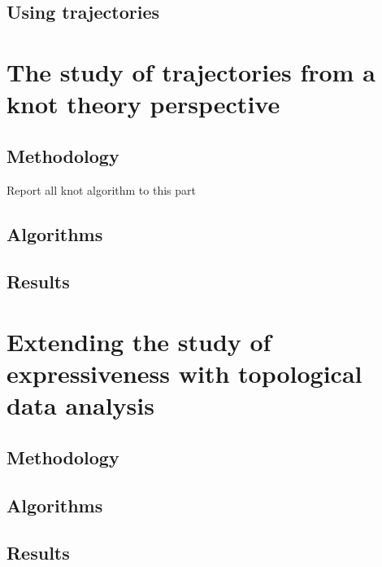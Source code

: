 \documentclass[12pt, a4paper]{article}
\begin{document}
\subsection{Using trajectories}

\newpage
\thispagestyle{empty}
\mbox{}
\newpage

\section{The study of trajectories from a knot theory perspective}

\subsection{Methodology}

Report all knot algorithm to this part

\subsection{Algorithms}

\subsection{Results}

\newpage
\thispagestyle{empty}
\mbox{}
\newpage

\section{Extending the study of expressiveness with topological data analysis} 
\subsection{Methodology}

\subsection{Algorithms}

\subsection{Results}

\newpage
\thispagestyle{empty}
\mbox{}
\newpage




\end{document}
